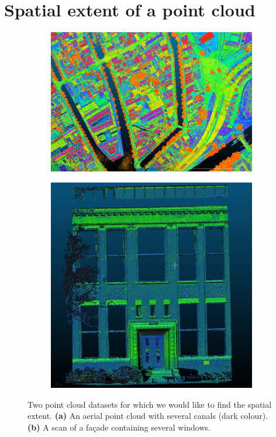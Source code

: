 
\graphicspath{{spatialextent/}}

\chapter{Spatial extent of a point cloud}
\label{chap:spatialextent}

\begin{figure}[h]
  \centering
  \begin{subfigure}[b]{0.57\linewidth}
    \centering
    \includegraphics[width=\textwidth]{figs/ahn3-water.png}
    \caption{}
  \end{subfigure}%
  \qquad
  \begin{subfigure}[b]{0.37\linewidth}
    \centering
    \includegraphics[page=2,width=\textwidth]{figs/facade.jpg}
    \caption{}
  \end{subfigure}
\caption{Two point cloud datasets for which we would like to find the spatial extent. \textbf{(a)} An aerial point cloud with several canals (dark colour). \textbf{(b)} A scan of a façade containing several windows.}
\label{fig:examples}  
\end{figure}


